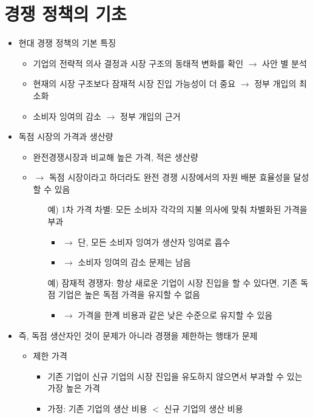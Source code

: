 \section{경쟁 정책의 기초}
\begin{itemize}
\item 현대 경쟁 정책의 기본 특징
	\begin{itemize}
	\item 기업의 전략적 의사 결정과 시장 구조의 동태적 변화를 확인 $\rightarrow$ 사안 별 분석
	\item 현재의 시장 구조보다 잠재적 시장 진입 가능성이 더 중요 $\rightarrow$ 정부 개입의 최소화
	\item 소비자 잉여의 감소 $\rightarrow$ 정부 개입의 근거
	\end{itemize}
\item 독점 시장의 가격과 생산량
	\begin{itemize}
	\item 완전경쟁시장과 비교해 높은 가격, 적은 생산량
	\item $\rightarrow$ 독점 시장이라고 하더라도 완전 경쟁 시장에서의 자원 배분 효율성을 달성할 수 있음
		\begin{itemize}
		\item[예)] 1차 가격 차별: 모든 소비자 각각의 지불 의사에 맞춰 차별화된 가격을 부과 
			\begin{itemize}
			\item $\rightarrow$ 단, 모든 소비자 잉여가 생산자 잉여로 흡수 
			\item $\rightarrow$ 소비자 잉여의 감소 문제는 남음
			\end{itemize}
		\item[예)] 잠재적 경쟁자: 항상 새로운 기업이 시장 진입을 할 수 있다면, 기존 독점 기업은 높은 독점 가격을 유지할 수 없음
			\begin{itemize}
			\item $\rightarrow$ 가격을 한계 비용과 같은 낮은 수준으로 유지할 수 있음
			\end{itemize}
		\end{itemize}
	\end{itemize}
\item 즉, 독점 생산자인 것이 문제가 아니라 경쟁을 제한하는 행태가 문제 \citep{Shapiro:2019aa}
	\begin{itemize}
	\item 제한 가격
		\begin{itemize}
		\item 기존 기업이 신규 기업의 시장 진입을 유도하지 않으면서 부과할 수 있는 가장 높은 가격
		\item 가정: 기존 기업의 생산 비용 $<$ 신규 기업의 생산 비용

\end{itemize}
\end{itemize}
\end{itemize}
